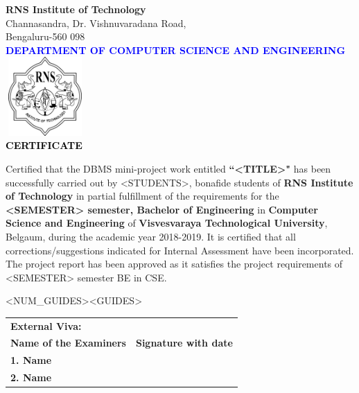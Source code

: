 \thispagestyle{empty}
\begin{center}

\textup{\large {\textcolor{darkbrown}{\bf RNS Institute of Technology}} \\ 
\normalsize{\textcolor{darkbrown}{Channasandra, Dr. Vishnuvaradana Road,\\ Bengaluru-560 098}}}\\[0.1in]
\textup{\normalsize {\textcolor{blue}{\bf DEPARTMENT OF COMPUTER SCIENCE AND ENGINEERING}}}\\[0.1in]
\includegraphics[width=3cm, height=3cm]{../static/media/RNS_logo.png}\\[0.1in]
\textup{\large {\textcolor{black}{\textbf {CERTIFICATE}}}} \\[0.1in]
\end{center}

\begin{minipage}{14.8cm}
Certified that the DBMS mini-project work entitled \textbf{``<TITLE>"} has been successfully carried out by <STUDENTS>, bonafide students of \textbf{RNS Institute of Technology } in partial fulfillment of the requirements for the \textbf{<SEMESTER> semester, Bachelor of Engineering} in \textbf{Computer Science and Engineering} of \textbf{Visvesvaraya Technological University}, Belgaum, during the academic year 2018-2019. It is certified that all corrections/suggestions indicated for Internal Assessment have been incorporated. The project report has been approved as it satisfies the project requirements of <SEMESTER> semester BE in CSE.\\[0.4in]
\end{minipage}

\begin{center}
\renewcommand\tabularxcolumn[1]{>{\Centering}p{#1}}
\begin{tabularx}{\linewidth}{<NUM_GUIDES>}<GUIDES>
\end{tabularx}
\renewcommand\tabularxcolumn[1]{}
\end{center}
\vfill
\begin{minipage}{14.8cm}
\begin{tabularx}{\linewidth}{X c}
\textbf{External Viva:}\\
\textbf{Name of the Examiners} & \textbf{Signature with date}\\
\textbf{1. Name}\\
\vfill
\textbf{2. Name}\\
\end{tabularx}
\end{minipage}

\pagebreak
